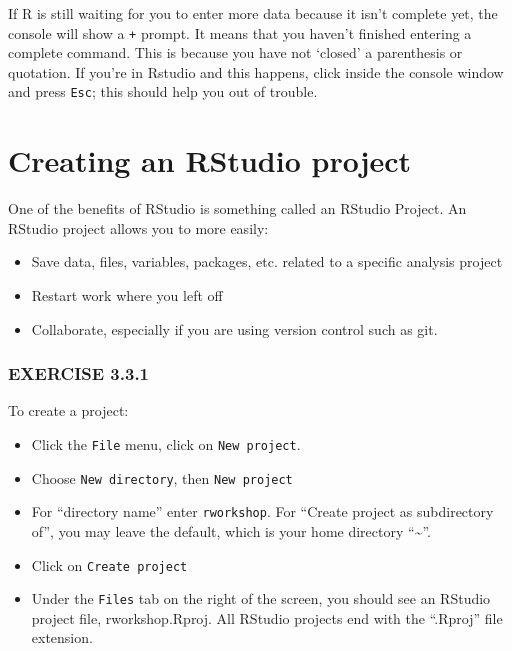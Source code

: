 \documentclass[
]{book}
\providecommand{\tightlist}{%
  \setlength{\itemsep}{0pt}\setlength{\parskip}{0pt}}
\begin{document}
If R is still waiting for you to enter more data because it isn't complete yet, the console will show a \texttt{+} prompt. It means that you haven't finished entering a complete command. This is because you have not `closed' a parenthesis or quotation. If you're in Rstudio and this happens, click inside the console window and press \texttt{Esc}; this should help you out of trouble.

\section{Creating an RStudio project}\label{creating-an-rstudio-project}

One of the benefits of RStudio is something called an RStudio Project. An RStudio project allows you to more easily:

\begin{itemize}
\tightlist
\item
  Save data, files, variables, packages, etc. related to a specific analysis project
\item
  Restart work where you left off
\item
  Collaborate, especially if you are using version control such as git.
\end{itemize}

\subsubsection*{EXERCISE 3.3.1}\label{exercise-3.3.1}

To create a project:

\begin{itemize}
\tightlist
\item
  Click the \texttt{File} menu, click on \texttt{New\ project}.
\item
  Choose \texttt{New\ directory}, then
  \texttt{New\ project}
\item
  For ``directory name'' enter \texttt{rworkshop}. For ``Create project as subdirectory of'', you may leave the default, which is your home directory ``\textasciitilde{}''.
\item
  Click on \texttt{Create\ project}
\item
  Under the \texttt{Files} tab on the right of the screen, you should see an RStudio project file, rworkshop.Rproj. All RStudio projects end with the ``.Rproj'' file extension.
\end{itemize}
\end{document}
